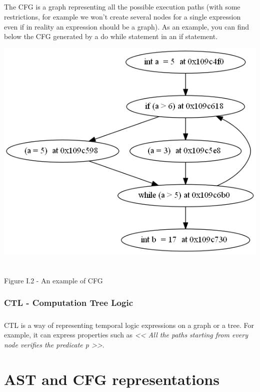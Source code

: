 \documentclass{report}
\begin{document}
\paragraph{}
\hspace{4mm}The CFG is a graph representing all the possible execution paths (with some restrictions, for example
we won't create several nodes for a single expression even if in reality an expression should be a graph).
As an example, you can find below the CFG generated by a  do while statement in an if statement.

\begin{center}
\includegraphics[scale=0.4]{data/doWhile}
~\\~\\Figure I.2 - An example of CFG
\end{center}

\subsection{CTL - Computation Tree Logic}

\paragraph{}
\hspace{4mm}CTL is a way of representing temporal logic expressions on a graph or a tree. For example, it can
express properties such as \textit{<< All the paths starting from every node verifies the predicate p >>}.

\chapter{AST and CFG representations}
\end{document}
